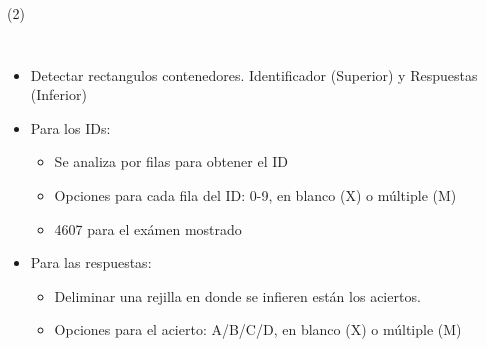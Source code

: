 \begin{frame}{\citetitle{\EntradaBibtex} (2)}
\begin{columns}

\begin{itemize}
\item Detectar rectangulos contenedores. Identificador (Superior) y Respuestas (Inferior)
\item Para los IDs:
\begin{itemize}
\item Se analiza por filas para obtener el ID
\item Opciones para cada fila del ID: 0-9, en blanco (X) o múltiple (M)
\item 4607 para el exámen mostrado
\end{itemize}
\item Para las respuestas:
\begin{itemize}
\item Deliminar una rejilla en donde se infieren están los aciertos.
\item Opciones para el acierto: A/B/C/D, en blanco (X) o múltiple (M)
\end{itemize}
\end{itemize}
	\begin{center}

\end{center}
\end{columns}
\end{frame}

